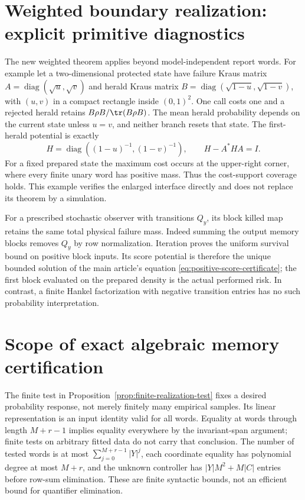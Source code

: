 
\section{Weighted boundary realization: explicit primitive diagnostics}\label{sec:supp-weighted}
The new weighted theorem applies beyond model-independent report words. For example let a two-dimensional protected state have failure Kraus matrix
$A=\operatorname{diag}(\sqrt{u},\sqrt{v})$ and herald Kraus matrix
$B=\operatorname{diag}(\sqrt{1-u},\sqrt{1-v})$, with $(u,v)$ in a compact rectangle inside $(0,1)^2$. One call costs one and a rejected herald retains $B\rho B/\tr(B\rho B)$. The mean herald probability depends on the current state unless $u=v$, and neither branch resets that state. The first-herald potential is exactly
\[
 H=\operatorname{diag}((1-u)^{-1},(1-v)^{-1}),\qquad H-A^*HA=I.
\]
For a fixed prepared state the maximum cost occurs at the upper-right corner, where every finite unary word has positive mass. Thus the cost-support coverage holds. This example verifies the enlarged interface directly and does not replace its theorem by a simulation.

For a prescribed stochastic observer with transitions $Q_y$, its block killed map retains the same total physical failure mass. Indeed summing the output memory blocks removes $Q_y$ by row normalization. Iteration proves the uniform survival bound on positive block inputs. Its score potential is therefore the unique bounded solution of the main article's equation \eqref{eq:positive-score-certificate}; the first block evaluated on the prepared density is the actual performed risk. In contrast, a finite Hankel factorization with negative transition entries has no such probability interpretation.

\section{Scope of exact algebraic memory certification}\label{sec:supp-realization-computation}
The finite test in Proposition~\ref{prop:finite-realization-test} fixes a desired probability response, not merely finitely many empirical samples. Its linear representation is an input identity valid for all words. Equality at words through length $M+r-1$ implies equality everywhere by the invariant-span argument; finite tests on arbitrary fitted data do not carry that conclusion. The number of tested words is at most $\sum_{j=0}^{M+r-1}|Y|^j$, each coordinate equality has polynomial degree at most $M+r$, and the unknown controller has $|Y|M^2+M|C|$ entries before row-sum elimination. These are finite syntactic bounds, not an efficient bound for quantifier elimination.

